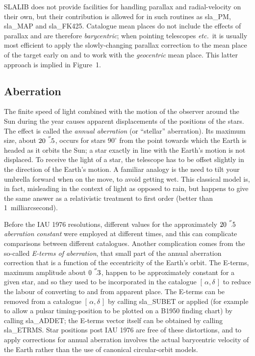 \documentclass[11pt,twoside,nolof]{starlink}
\providecommand{\radec}     {$[\,\alpha,\delta\,]$}
\providecommand{\arcsec}[2] {\arcseci{#1}$\hspace{-0.4em}.#2$}
\providecommand{\arcseci}[1] {$#1\hspace{-0.05em}$\raisebox{-0.5ex}
                         {$^{'\hspace{-0.1em}'}$}}
\begin{document}
SLALIB does not provide facilities for handling parallax
and radial-velocity on their own, but their contribution is
allowed for in such routines as
sla\_PM,
sla\_MAP
and
sla\_FK425.
Catalogue mean
places do not include the effects of parallax and are therefore
\textit{barycentric};  when pointing telescopes \textit{etc.}\ it is
usually most efficient to apply the slowly-changing
parallax correction to the mean place of the target early on
and to work with the \textit{geocentric}\/ mean place.  This latter
approach is implied in Figure~1.

\subsection{Aberration}
The finite speed of light combined with the motion of the observer
around the Sun during the year causes apparent displacements of
the positions of the stars.  The effect is called
the \textit{annual aberration} (or ``stellar''
aberration).  Its maximum size, about \arcsec{20}{5},
occurs for stars $90^{\circ}$ from the point towards which
the Earth is headed as it orbits the Sun;  a star exactly in line with
the Earth's motion is not displaced.  To receive the light of
a star, the telescope has to be offset slightly in the direction of
the Earth's motion.  A familiar analogy is the need to tilt your
umbrella forward when on the move, to avoid getting wet.  This
classical model is,
in fact, misleading in the context of light as opposed
to rain, but happens to give the same answer as a relativistic
treatment to first order (better than 1~milliarcsecond).

Before the IAU 1976 resolutions, different
values for the approximately
\arcsec{20}{5} \textit{aberration constant}\/ were employed
at different times, and this can complicate comparisons
between different catalogues.  Another complication comes from
the so-called \textit{E-terms of aberration},
that small part of the annual aberration correction that is a
function of the eccentricity of the Earth's orbit.  The E-terms,
maximum amplitude about \arcsec{0}{3},
happen to be approximately constant for a given star, and so they
used to be incorporated in the catalogue \radec\/
to reduce the labour of converting to and from apparent place.
The E-terms can be removed from a catalogue \radec\/ by
calling
sla\_SUBET
or applied (for example to allow a pulsar
timing-position to be plotted on a B1950 finding chart)
by calling
sla\_ADDET;
the E-terms vector itself can be obtained by calling
sla\_ETRMS.
Star positions post IAU 1976 are free of these distortions, and to
apply corrections for annual aberration involves the actual
barycentric velocity of the Earth rather than the use of
canonical circular-orbit models.
\end{document}
